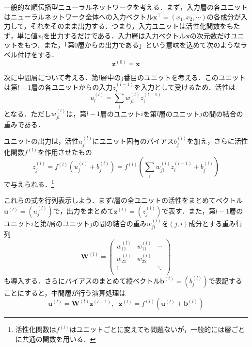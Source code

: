 \documentclass[a4paper,11pt]{jsreport}
\begin{document}
一般的な順伝播型ニューラルネットワークを考える．まず，入力層の各ユニットはニューラルネットワーク全体への入力ベクトル$\bm{x}^{\top}=(x_1, x_2, \cdots)$の各成分が入力して，それをそのまま出力する．つまり，入力ユニットは活性化関数をもたず，単に値$x_i$を出力するだけである．入力層は入力ベクトル$\bm{x}$の次元数だけユニットをもつ．また，「第0層からの出力である」という意味を込めて次のようなラベル付けをする．
\begin{equation}
  \bm{z}^{(0)} = \bm{x}
\end{equation}\par
次に中間層について考える．第$l$層中の$j$番目のユニットを考える．このユニットは第$l-1$層の各ユニットからの入力$z_i^{(l-1)}$を入力として受けるため．活性は
\begin{equation}
  u_l^{(l)} = \sum_i w_{ji}^{(l)} z_i^{(l-1)}
\end{equation}
となる．ただし$w_{ji}^{(l)}$は，第$l-1$層のユニット$i$を第$l$層のユニット$j$の間の結合の重みである．\par
ユニットの出力は，活性$u_j^{(l)}$にユニット固有のバイアス$b_j^{(l)}$を加え，さらに活性化関数$f^{(l)}$を作用させたもの
\begin{equation}
  z_j^{(l)}
  = f^{(l)} \left( u_j^{(l)} + b_j^{(l)} \right)
  = f^{(l)} \left( \sum_i w_{ji}^{(l)} z_i^{(l-1)} + b_j^{(l)} \right)
\end{equation}
で与えられる．\footnote{活性化関数は$f^{(l)}$はユニットごとに変えても問題ないが，一般的には層ごとに共通の関数を用いる．}\par
これらの式を行列表示しよう．まず$l$層の全ユニットの活性をまとめてベクトル$\bm{u}^{(l)}=\left( u_j^{(l)} \right)$で，出力をまとめて$\bm{z}^{(l)}=\left( z_j^{(l)} \right)$で表す．また，第$l-1$層のユニット$i$と第$l$層のユニット$j$の間の結合の重み$w_{ji}^{(l)}$を$(j,i)$成分とする重み行列
\begin{equation}
  \bm{W}^{(l)}
  =\begin{pmatrix}
    w_{11}^{(l)} & w_{11}^{(l)} & \cdots \\
    w_{21}^{(l)} & w_{22}^{(l)} &        \\
    \vdots       &              & \ddots \\
  \end{pmatrix}
\end{equation}
も導入する．さらにバイアスのまとめて縦ベクトル$\bm{b}^{(l)} = \left( b_j^{(l)} \right)$で表記することにすると，中間層が行う演算処理は
\begin{equation}
  \bm{u}^{(l)}
  = \bm{W}^{(l)} \bm{z}^{(l-1)}, \ \ \ \bm{z}^{(l)} = f^{(l)}\left( \bm{u}^{(l)} + \bm{b}^{(l)} \right)
\end{equation}
\end{document}
